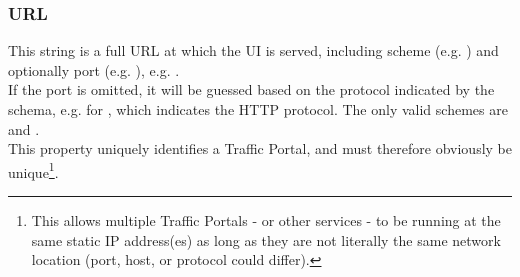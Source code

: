\subsubsection{URL}
This string is a full URL at which the UI is served, including scheme (e.g.
) and optionally port (e.g. ), e.g.
.\\
If the port is omitted, it will be guessed based on the protocol indicated by
the schema, e.g.  for , which indicates the HTTP
protocol. The only valid schemes are  and .\\
This property uniquely identifies a Traffic Portal, and must therefore
obviously be unique\footnote{This allows multiple Traffic Portals - or other
services - to be running at the same static IP address(es) as long as they
are not literally the same network location (port, host, or protocol could
differ).}.
